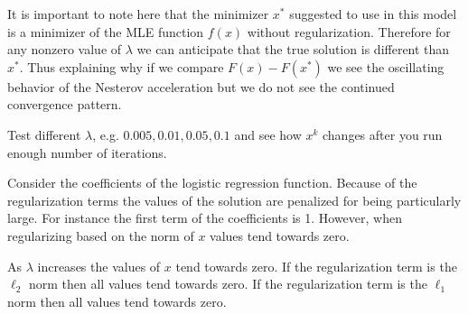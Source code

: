 \documentclass[11pt, answers]{exam}
\begin{document}
\begin{questions}
\begin{solution}
		It is important to note here that the minimizer $x^*$ suggested to use in this model is a minimizer of the MLE function $f(x)$ without regularization. Therefore for any nonzero value of $\lambda$ we can anticipate that the true solution is different than $x^*$. Thus explaining why if we compare $F(x)-F(x^*)$ we see the oscillating behavior of the Nesterov acceleration but we do not see the continued convergence pattern.
		
	\end{solution}

	\pagebreak

	\question Test different $\lambda$, e.g. $0.005,0.01,0.05,0.1$ and see how $x^k$ changes after you run enough number of iterations.
	
	\begin{solution}
	
		Consider the coefficients of the logistic regression function. Because of the regularization terms the values of the solution are penalized for being particularly large. For instance the first term of the coefficients is 1. However, when regularizing based on the norm of $x$ values tend towards zero.
		
		 As $\lambda$ increases the values of $x$ tend towards zero. If the regularization term is the $\ell_2$ norm then all values tend towards zero. If the regularization term is the $\ell_1$ norm then all values tend towards zero.
		 

\end{solution}
\end{questions}
\end{document}
